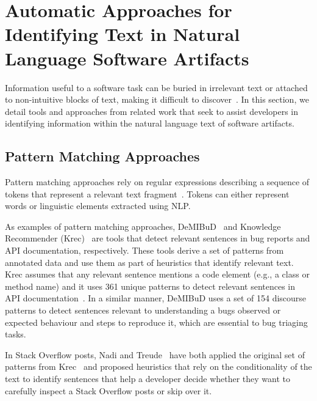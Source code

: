 \section{Automatic Approaches for Identifying Text in Natural Language Software Artifacts}
\label{cp2:text-approaches}



Information useful to a software task can be buried in irrelevant text or attached to 
non-intuitive blocks of text, making it difficult to discover~\cite{Robillard2015}.
In this section, we detail tools and approaches from related work
that seek to assist developers in 
identifying information within the natural language
text of software artifacts.





\subsection{Pattern Matching Approaches}
\label{cp2:pattern-matching}


Pattern matching approaches rely on regular expressions describing a sequence of tokens that represent
 a relevant text fragment~\cite{Bavota2016}. Tokens can either represent words or linguistic elements 
extracted using \acf{NLP}.
    
    
As examples  of pattern matching approaches,  {\small DeMIBuD}~\cite{Chaparro2017}
 and Knowledge Recommender (Krec)~\cite{Maalej2013, Robillard2015} are tools that detect relevant sentences in bug reports and API documentation, respectively. 
These tools derive a set of patterns from annotated data and use them as part of heuristics 
that identify relevant text. Krec assumes that any relevant sentence mentions a 
code element (e.g., a class or method name) and it uses  361 unique patterns
to 
detect relevant sentences in API documentation~\cite{Robillard2015}.
In a similar manner, {\small DeMIBuD} uses a set of 154 discourse patterns to detect sentences 
relevant to understanding a bugs observed or expected behaviour and steps to reproduce it,
which are essential to bug triaging tasks.




In Stack Overflow posts,
Nadi and Treude~\cite{nadi2020} have both applied the original set of patterns from Krec~\cite{Robillard2015} 
and proposed heuristics that rely on the conditionality of the text
to identify sentences that help a developer 
decide whether they want to carefully inspect a Stack Overflow posts or skip over it. 



